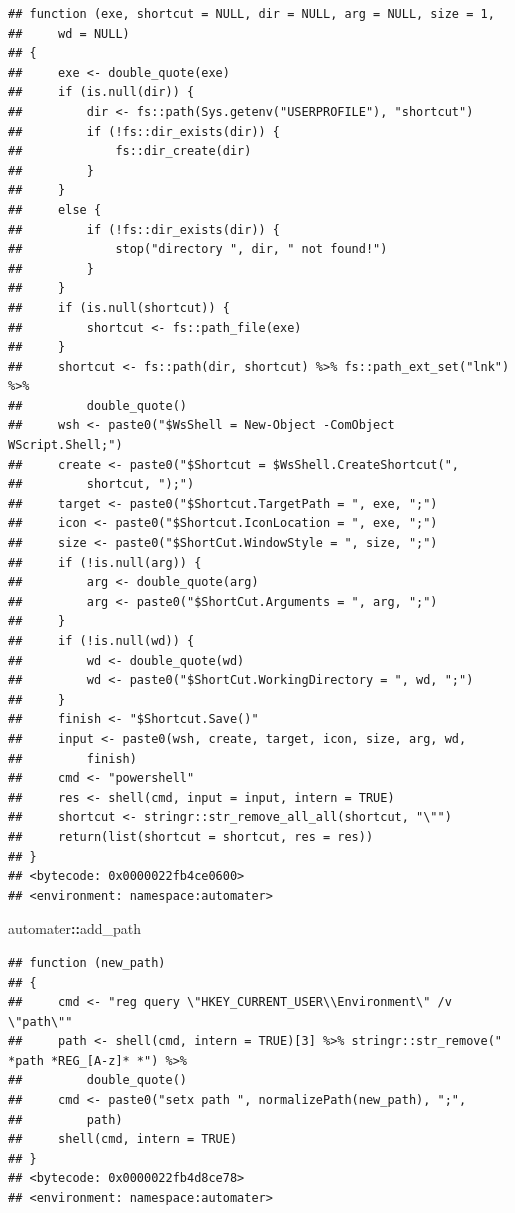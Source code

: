 \documentclass[
]{article}
\newenvironment{Shaded}{\begin{snugshade}}{\end{snugshade}}
\newcommand{\NormalTok}[1]{#1}
\newcommand{\SpecialCharTok}[1]{\textcolor[rgb]{0.81,0.36,0.00}{\textbf{#1}}}
\begin{document}
\begin{verbatim}
## function (exe, shortcut = NULL, dir = NULL, arg = NULL, size = 1, 
##     wd = NULL) 
## {
##     exe <- double_quote(exe)
##     if (is.null(dir)) {
##         dir <- fs::path(Sys.getenv("USERPROFILE"), "shortcut")
##         if (!fs::dir_exists(dir)) {
##             fs::dir_create(dir)
##         }
##     }
##     else {
##         if (!fs::dir_exists(dir)) {
##             stop("directory ", dir, " not found!")
##         }
##     }
##     if (is.null(shortcut)) {
##         shortcut <- fs::path_file(exe)
##     }
##     shortcut <- fs::path(dir, shortcut) %>% fs::path_ext_set("lnk") %>% 
##         double_quote()
##     wsh <- paste0("$WsShell = New-Object -ComObject WScript.Shell;")
##     create <- paste0("$Shortcut = $WsShell.CreateShortcut(", 
##         shortcut, ");")
##     target <- paste0("$Shortcut.TargetPath = ", exe, ";")
##     icon <- paste0("$Shortcut.IconLocation = ", exe, ";")
##     size <- paste0("$ShortCut.WindowStyle = ", size, ";")
##     if (!is.null(arg)) {
##         arg <- double_quote(arg)
##         arg <- paste0("$ShortCut.Arguments = ", arg, ";")
##     }
##     if (!is.null(wd)) {
##         wd <- double_quote(wd)
##         wd <- paste0("$ShortCut.WorkingDirectory = ", wd, ";")
##     }
##     finish <- "$Shortcut.Save()"
##     input <- paste0(wsh, create, target, icon, size, arg, wd, 
##         finish)
##     cmd <- "powershell"
##     res <- shell(cmd, input = input, intern = TRUE)
##     shortcut <- stringr::str_remove_all_all(shortcut, "\"")
##     return(list(shortcut = shortcut, res = res))
## }
## <bytecode: 0x0000022fb4ce0600>
## <environment: namespace:automater>
\end{verbatim}

\begin{Shaded}
\begin{Highlighting}[]
\NormalTok{automater}\SpecialCharTok{::}\NormalTok{add\_path}
\end{Highlighting}
\end{Shaded}

\begin{verbatim}
## function (new_path) 
## {
##     cmd <- "reg query \"HKEY_CURRENT_USER\\Environment\" /v \"path\""
##     path <- shell(cmd, intern = TRUE)[3] %>% stringr::str_remove(" *path *REG_[A-z]* *") %>% 
##         double_quote()
##     cmd <- paste0("setx path ", normalizePath(new_path), ";", 
##         path)
##     shell(cmd, intern = TRUE)
## }
## <bytecode: 0x0000022fb4d8ce78>
## <environment: namespace:automater>
\end{verbatim}
\end{document}
